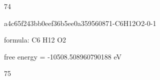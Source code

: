 \documentclass{article}
\begin{document}
74

\vspace{1cm}


a4c65f243bb0eef36b5ee0a359560871-C6H12O2-0-1



formula: C6 H12 O2



free energy = -10508.508960790188 eV

75
\end{document}
